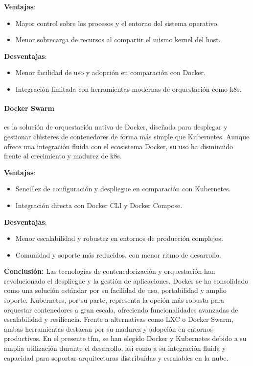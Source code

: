 \textbf{Ventajas}:
\begin{itemize}
    \item Mayor control sobre los procesos y el entorno del sistema operativo.
    \item Menor sobrecarga de recursos al compartir el mismo kernel del host.
\end{itemize}

\textbf{Desventajas}:
\begin{itemize}
    \item Menor facilidad de uso y adopción en comparación con Docker.
    \item Integración limitada con herramientas modernas de orquestación como \gls{k8s}.
\end{itemize}

\paragraph{Docker Swarm~\cite{dockerswarm}} es la solución de orquestación nativa de Docker, diseñada para desplegar y gestionar clústeres de contenedores de forma más simple que Kubernetes. Aunque ofrece una integración fluida con el ecosistema Docker, su uso ha disminuido frente al crecimiento y madurez de \gls{k8s}.

\textbf{Ventajas}:
\begin{itemize}
    \item Sencillez de configuración y despliegue en comparación con Kubernetes.
    \item Integración directa con Docker CLI y Docker Compose.
\end{itemize}

\textbf{Desventajas}:
\begin{itemize}
    \item Menor escalabilidad y robustez en entornos de producción complejos.
    \item Comunidad y soporte más reducidos, con menor ritmo de desarrollo.
\end{itemize}
\textbf{Conclusión:} Las tecnologías de contenedorización y orquestación han revolucionado el despliegue y la gestión de aplicaciones. Docker se ha consolidado como una solución estándar por su facilidad de uso, portabilidad y amplio soporte. Kubernetes, por su parte, representa la opción más robusta para orquestar contenedores a gran escala, ofreciendo funcionalidades avanzadas de escalabilidad y resiliencia. Frente a alternativas como LXC o Docker Swarm, ambas herramientas destacan por su madurez y adopción en entornos productivos. En el presente \gls{tfm}, se han elegido Docker y Kubernetes debido a su amplia utilización durante el desarrollo, así como a su integración fluida y capacidad para soportar arquitecturas distribuidas y escalables en la nube.
